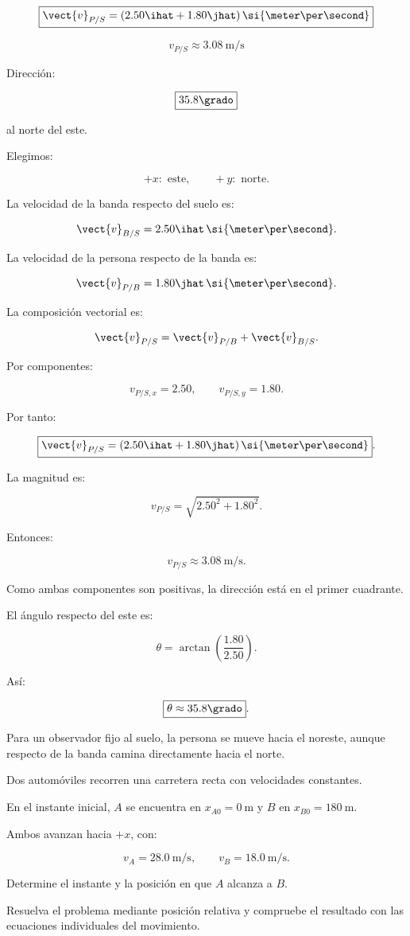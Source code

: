 \begin{respuesta}
\[
\boxed{
\vect{v}_{P/S}
=
(2.50\ihat+1.80\jhat)\,
\si{\meter\per\second}
}
\]

\[
\boxed{
v_{P/S}\approx
\SI{3.08}{\meter\per\second}
}
\]

Dirección:

\[
\boxed{
35.8\grado
}
\]

al norte del este.
\end{respuesta}

\begin{explicacion}
Elegimos:

\[
+x:\text{ este},
\qquad
+y:\text{ norte}.
\]

La velocidad de la banda respecto del suelo es:

\[
\vect{v}_{B/S}
=
2.50\ihat\,
\si{\meter\per\second}.
\]

La velocidad de la persona respecto
de la banda es:

\[
\vect{v}_{P/B}
=
1.80\jhat\,
\si{\meter\per\second}.
\]

La composición vectorial es:

\[
\vect{v}_{P/S}
=
\vect{v}_{P/B}
+
\vect{v}_{B/S}.
\]

Por componentes:

\[
v_{P/S,x}=2.50,
\qquad
v_{P/S,y}=1.80.
\]

Por tanto:

\[
\boxed{
\vect{v}_{P/S}
=
(2.50\ihat+1.80\jhat)\,
\si{\meter\per\second}
}.
\]

La magnitud es:

\[
v_{P/S}
=
\sqrt{2.50^2+1.80^2}.
\]

Entonces:

\[
\boxed{
v_{P/S}\approx
\SI{3.08}{\meter\per\second}
}.
\]

Como ambas componentes son positivas,
la dirección está en el primer cuadrante.

El ángulo respecto del este es:

\[
\theta
=
\arctan\left(\frac{1.80}{2.50}\right).
\]

Así:

\[
\boxed{
\theta\approx35.8\grado
}.
\]

Para un observador fijo al suelo, la persona
se mueve hacia el noreste, aunque respecto
de la banda camina directamente hacia el norte.
\end{explicacion}


\begin{ejercicio}
Dos automóviles recorren una carretera recta
con velocidades constantes.

En el instante inicial, \(A\) se encuentra
en \(x_{A0}=\SI{0}{\meter}\) y \(B\)
en \(x_{B0}=\SI{180}{\meter}\).

Ambos avanzan hacia \(+x\), con:

\[
v_A=\SI{28.0}{\meter\per\second},
\qquad
v_B=\SI{18.0}{\meter\per\second}.
\]

Determine el instante y la posición
en que \(A\) alcanza a \(B\).

Resuelva el problema mediante posición relativa
y compruebe el resultado con las ecuaciones
individuales del movimiento.
\end{ejercicio}

